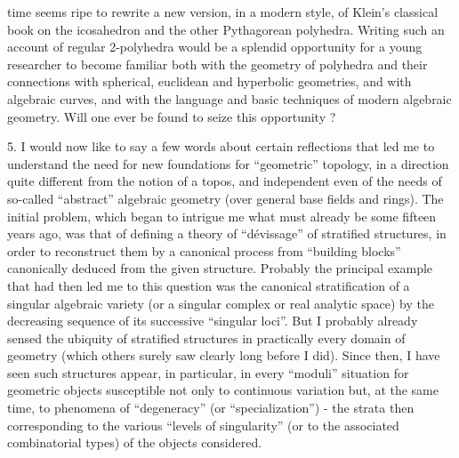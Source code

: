 
time seems ripe to rewrite a new version, in a modern
style, of Klein's classical book on the icosahedron and the other
Pythagorean polyhedra. Writing such an account of regular
2-polyhedra would be a splendid opportunity for a young researcher
to become familiar both with the geometry of polyhedra and
their connections with spherical, euclidean and hyperbolic geometries,
and with algebraic curves, and with the language and
basic techniques of modern algebraic geometry. Will one
ever be found to seize this opportunity ?

5. \qquad I would now like to say a few words about certain
reflections that led me to understand the need for new foundations
for ``geometric'' topology, in a direction quite
different from the notion of a topos, and independent even of the needs
of so-called ``abstract'' algebraic geometry (over general base fields
and rings). The initial problem, which began to
intrigue me what must already be some fifteen years ago, was
that of defining a theory of ``dévissage''
of stratified structures, in order to reconstruct them by a canonical process
from ``building blocks'' canonically deduced from the given
structure. Probably the principal example that had then led me
to this question was the canonical stratification of a
singular algebraic variety (or a singular complex or real analytic
space) by the decreasing sequence of its successive
``singular loci''. But I probably already sensed the ubiquity
of stratified structures in practically every domain of
geometry (which others surely saw clearly long before
I did). Since then, I have seen such structures appear, in particular,
in every ``moduli'' situation for geometric objects susceptible
not only to continuous variation but, at the same time,
to phenomena of ``degeneracy'' (or ``specialization'') - the
strata then corresponding to the various ``levels of singularity''
(or to the associated combinatorial types) of the objects considered.


